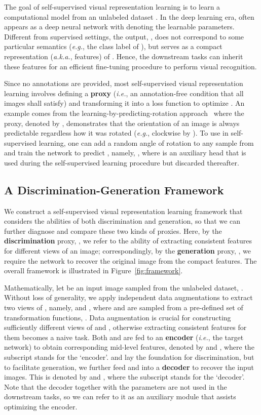 \documentclass[10pt,twocolumn,letterpaper]{article}
\begin{document}
The goal of self-supervised visual representation learning is to learn a computational model  from an unlabeled dataset . In the deep learning era,  often appears as a deep neural network with  denoting the learnable parameters. Different from supervised settings, the output, , does not correspond to some particular semantics (\textit{e.g.}, the class label of ), but serves as a compact representation (\textit{a.k.a.}, features) of . Hence, the downstream tasks can inherit these features for an efficient fine-tuning procedure to perform visual recognition.

Since no annotations are provided, most self-supervised visual representation learning involves defining a \textbf{proxy} (\textit{i.e.}, an annotation-free condition that all images shall satisfy)  and transforming it into a loss function  to optimize . An example comes from the learning-by-predicting-rotation approach~\cite{rotation} where the proxy, denoted by , demonstrates that the orientation of an image is always predictable regardless how it was rotated (\textit{e.g.}, clockwise by ). To use  in self-supervised learning, one can add a random angle of rotation  to any sample  from  and train the network to predict , namely, , where  is an auxiliary head that is used during the self-supervised learning procedure but discarded thereafter.

\subsection{A Discrimination-Generation Framework}
\label{approach:framework}

We construct a self-supervised visual representation learning framework that considers the abilities of both discrimination and generation, so that we can further diagnose and compare these two kinds of proxies. Here, by the \textbf{discrimination} proxy, , we refer to the ability of extracting consistent features for different views of an image; correspondingly, by the \textbf{generation} proxy, , we require the network to recover the original image from the compact features. The overall framework is illustrated in Figure~\ref{fig:framework}.

Mathematically, let  be an input image sampled from the unlabeled dataset, . Without loss of generality, we apply independent data augmentations to extract two views of , namely,  and , where  and  are sampled from a pre-defined set of transformation functions, . Data augmentation is crucial for constructing sufficiently different views of  and , otherwise extracting consistent features for them becomes a naive task. Both  and  are fed to an \textbf{encoder} (\textit{i.e.}, the target network) to obtain corresponding mid-level features, denoted by  and , where the subscript  stands for the `encoder'.  and  lay the foundation for discrimination, but to facilitate generation, we further feed  and  into a \textbf{decoder} to recover the input images. This is denoted by  and , where the subscript  stands for the `decoder'. Note that the decoder together with the parameters are not used in the downstream tasks, so we can refer to it as an auxiliary module that assists optimizing the encoder.
\end{document}
